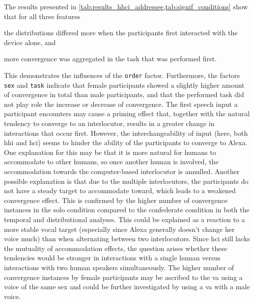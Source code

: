 The results presented in \cref{tab:results_hhci_addressee,tab:signif_conditions} show that for all three features
\begin{enumerate*}[(a)]
	\item the distributions differed more when the participants first interacted with the device alone, and
	\item more convergence was aggregated in the task that was performed first.
\end{enumerate*}
This demonstrates the influences of the \texttt{order} factor.
Furthermore, the factors \texttt{sex} and \texttt{task} indicate that female participants showed a slightly higher amount of convergence in total than male participants, and that the performed task did not play role the increase or decrease of convergence.
The first speech input a participant encounters may cause a priming effect that, together with the natural tendency to converge to an interlocutor, results in a greater change in interactions that occur first.
However, the interchangeability of input (here, both \ac{hhi} and \ac{hci}) seems to hinder the ability of the participants to converge to Alexa.
One explanation for this may be that it is more natural for humans to accommodate to other humans, so once another human is involved, the accommodation towards the computer-based interlocutor is annulled.
Another possible explanation is that due to the multiple interlocutors, the participants do not have a steady target to accommodate toward, which leads to a weakened convergence effect.
This is confirmed by the higher number of convergence instances in the solo condition compared to the confederate condition in both the temporal and distributional analyses.
This could be explained as a reaction to a more stable vocal target (especially since Alexa generally doesn't change her voice much) than when alternating between two interlocutors.
Since \ac{hci} still lacks the mutuality of accommodation effects, the question arises whether these tendencies would be stronger in interactions with a single human versus interactions with two human speakers simultaneously.
The higher number of convergence instances by female participants may be ascribed to the \ac{va} using a voice of the same sex and could be further investigated by using a \ac{va} with a male voice.

